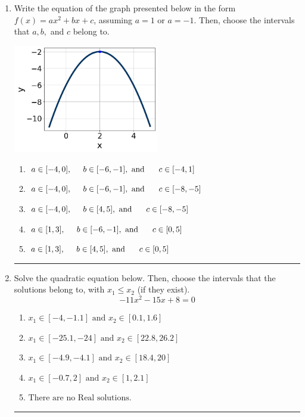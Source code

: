 \documentclass[14pt]{extbook}
\newcommand{\litem}[1]{\item#1\hspace*{-1cm}\rule{\textwidth}{0.4pt}}
\begin{document}
\begin{enumerate}
{\begin{enumerate}[label=\Alph*.]
\end{enumerate} }
\litem{
Write the equation of the graph presented below in the form $f(x)=ax^2+bx+c$, assuming  $a=1$ or $a=-1$. Then, choose the intervals that $a, b,$ and $c$ belong to.
\begin{center}
    \includegraphics[width=0.5\textwidth]{../Figures/quadraticGraphToEquationCopyB.png}
\end{center}
\begin{enumerate}[label=\Alph*.]
\item \( a \in [-4, 0], \hspace*{5mm} b \in [-6, -1], \text{ and } \hspace*{5mm} c \in [-4, 1] \)
\item \( a \in [-4, 0], \hspace*{5mm} b \in [-6, -1], \text{ and } \hspace*{5mm} c \in [-8, -5] \)
\item \( a \in [-4, 0], \hspace*{5mm} b \in [4, 5], \text{ and } \hspace*{5mm} c \in [-8, -5] \)
\item \( a \in [1, 3], \hspace*{5mm} b \in [-6, -1], \text{ and } \hspace*{5mm} c \in [0, 5] \)
\item \( a \in [1, 3], \hspace*{5mm} b \in [4, 5], \text{ and } \hspace*{5mm} c \in [0, 5] \)

\end{enumerate} }
\litem{
Solve the quadratic equation below. Then, choose the intervals that the solutions belong to, with $x_1 \leq x_2$ (if they exist).\[ -11x^{2} -15 x + 8 = 0 \]\begin{enumerate}[label=\Alph*.]
\item \( x_1 \in [-4, -1.1] \text{ and } x_2 \in [0.1, 1.6] \)
\item \( x_1 \in [-25.1, -24] \text{ and } x_2 \in [22.8, 26.2] \)
\item \( x_1 \in [-4.9, -4.1] \text{ and } x_2 \in [18.4, 20] \)
\item \( x_1 \in [-0.7, 2] \text{ and } x_2 \in [1, 2.1] \)
\item \( \text{There are no Real solutions.} \)


\end{enumerate}}
\end{enumerate}
\end{document}
